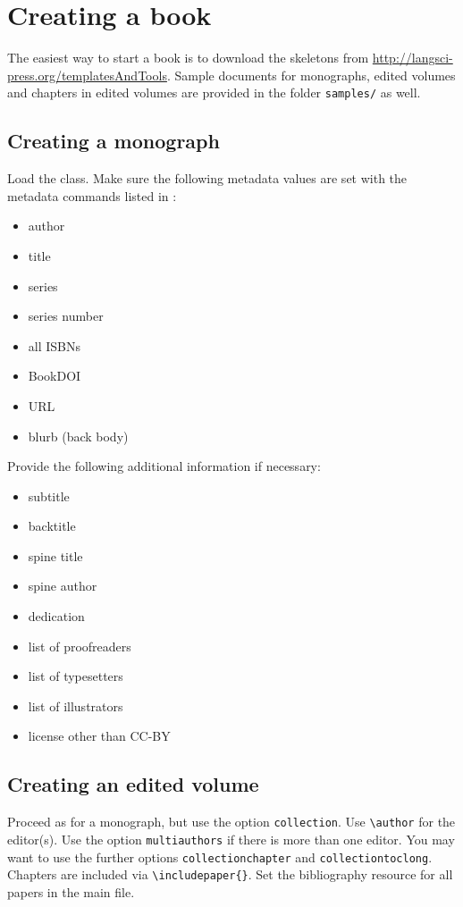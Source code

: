 \documentclass[%
output=guidelines,
guidelines]{../langscibook}
\begin{document}
\chapter{Creating a book}
The easiest way to start a book is to download the skeletons from \url{http://langsci-press.org/templatesAndTools}. Sample documents for monographs, edited volumes and chapters in edited volumes are provided in the folder \texttt{samples/} as well. 

\section{Creating a monograph}
Load the class. Make sure the following metadata values are set with the metadata commands listed in :

\begin{itemize}
 \item author 
 \item title
 \item series 
 \item series number
 \item all ISBNs
 \item BookDOI
 \item URL
 \item blurb (back body)
\end{itemize}

Provide the following additional information if necessary:
\begin{itemize}
 \item subtitle
 \item backtitle
 \item spine title 
 \item spine author
 \item dedication 
 \item list of proofreaders 
 \item list of typesetters
 \item list of illustrators 
 \item license other than CC-BY
\end{itemize}

 
\section{Creating an edited volume}
Proceed as for a monograph, but use the option \texttt{collection}. Use \verb+\author+ for the editor(s). Use the option \texttt{multiauthors} if there is more than one editor. You may want to use the further options \texttt{collectionchapter} and \texttt{collectiontoclong}. Chapters are included via \verb+\includepaper{}+. Set the bibliography resource for all papers in the main file. 
\end{document}
